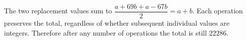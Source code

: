 The two replacement values sum to $\dfrac{a+69b+a-67b}{2}=a+b$. Each operation preserves the total, regardless of whether subsequent individual values are integers. Therefore after any number of operations the total is still $\boxed{22286}$.
